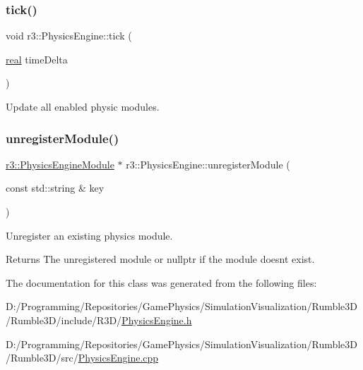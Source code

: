 \subsubsection{\texorpdfstring{tick()}{tick()}}
{\footnotesize\ttfamily void r3\+::\+Physics\+Engine\+::tick (\begin{DoxyParamCaption}\item[{\mbox{\hyperlink{namespacer3_ab2016b3e3f743fb735afce242f0dc1eb}{real}}}]{time\+Delta }\end{DoxyParamCaption})}



Update all enabled physic modules. 

\mbox{\label{classr3_1_1_physics_engine_a54dfdfda1b3f7eb33e9603d247f45aa8}} 
\subsubsection{\texorpdfstring{unregister\+Module()}{unregisterModule()}}
{\footnotesize\ttfamily \mbox{\hyperlink{classr3_1_1_physics_engine_module}{r3\+::\+Physics\+Engine\+Module}} $\ast$ r3\+::\+Physics\+Engine\+::unregister\+Module (\begin{DoxyParamCaption}\item[{const std\+::string \&}]{key }\end{DoxyParamCaption})}



Unregister an existing physics module. 

\begin{DoxyReturn}{Returns}
The unregistered module or nullptr if the module doesn\textquotesingle{}t exist. 
\end{DoxyReturn}


The documentation for this class was generated from the following files\+:\begin{DoxyCompactItemize}
\item 
D\+:/\+Programming/\+Repositories/\+Game\+Physics/\+Simulation\+Visualization/\+Rumble3\+D/\+Rumble3\+D/include/\+R3\+D/\mbox{\hyperlink{_physics_engine_8h}{Physics\+Engine.\+h}}\item 
D\+:/\+Programming/\+Repositories/\+Game\+Physics/\+Simulation\+Visualization/\+Rumble3\+D/\+Rumble3\+D/src/\mbox{\hyperlink{_physics_engine_8cpp}{Physics\+Engine.\+cpp}}\end{DoxyCompactItemize}
